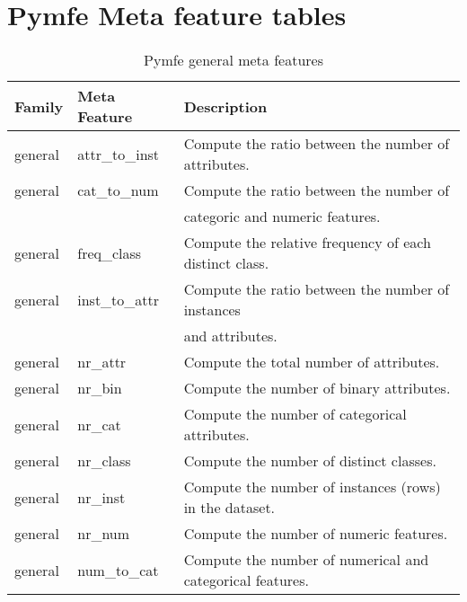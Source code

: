 \chapter{Pymfe Meta feature tables} \label{ap1:pymfe_mf}

\begin{table}[h!]
  \centering
  \caption{Pymfe general meta features}
  \setlength{\tabcolsep}{8pt}
  \renewcommand{\arraystretch}{1.2}
  \begin{tabular}{lll}
    \hline
    Family & Meta Feature & Description \\ \hline
  general & attr\_to\_inst & Compute the ratio between the number of attributes.\\
  general & cat\_to\_num & Compute the ratio between the number of \\ & & categoric and numeric features.\\
  general & freq\_class & Compute the relative frequency of each distinct class.\\
  general & inst\_to\_attr & Compute the ratio between the number of instances\\ & & and attributes.\\
  general & nr\_attr & Compute the total number of attributes.\\
  general & nr\_bin & Compute the number of binary attributes.\\
  general & nr\_cat & Compute the number of categorical attributes.\\
  general & nr\_class & Compute the number of distinct classes.\\
  general & nr\_inst & Compute the number of instances (rows) in the dataset.\\
  general & nr\_num & Compute the number of numeric features.\\
  general & num\_to\_cat & Compute the number of numerical and categorical features. \\ \hline
  \end{tabular}
  \label{tab:pymfe-general-mf}
\end{table}


